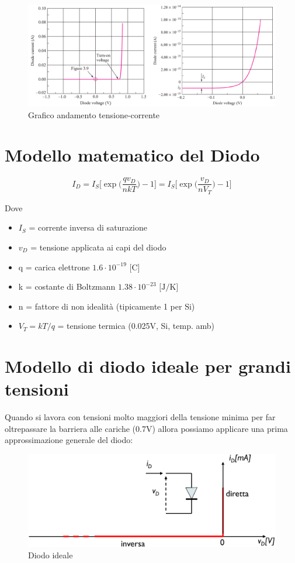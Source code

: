 \begin{figure}[htbp]
    \centering
    \includegraphics[width=0.97\linewidth]{img/potenziale_diodoi.png}
    \caption{Grafico andamento tensione-corrente}
    
\end{figure}

\newpage
\section{Modello matematico del Diodo}

\begin{equation}
    I_D = I_S\biggl[\exp{\biggl(\frac{qv_D}{nkT}\biggl)-1}\biggl] = I_S\biggl[\exp{\biggl(\frac{v_D}{nV_T}\biggl)-1}\biggl]
\end{equation}

Dove

\begin{itemize}
    \item $I_S$ =	corrente	inversa	di	saturazione
    \item $v_D$ =	tensione	applicata	ai	capi	del	diodo
    \item q = carica elettrone $1.6\cdot10^{-19} \text{ [C]}$
    \item k = costante	di	Boltzmann $1.38\cdot10^{-23} \text{ [J/K]}$
    \item n	=	fattore	di	non	idealità	(tipicamente	1 per Si)
    \item $V_T = kT/q$ = tensione termica (0.025V, Si, temp. amb)
\end{itemize}


\section{Modello di diodo ideale per grandi tensioni}
Quando si lavora con tensioni molto maggiori della tensione minima per far oltrepassare la barriera alle cariche (0.7V) allora possiamo applicare una prima approssimazione generale del diodo:
\begin{figure}[htbp]
    \centering
    \includegraphics[width=0.65\linewidth]{img/diodo_Ideale.png}
    \caption{Diodo ideale}    
\end{figure}

